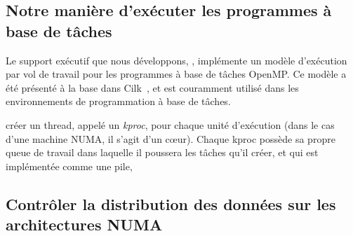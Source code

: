 \documentclass[parallelisme]{compas2016}
\begin{document}





\subsection{Notre manière d'exécuter les programmes à base de tâches}

Le support exécutif que nous développons, \kaapi, implémente un modèle d'exécution par vol
de travail pour les programmes à base de tâches OpenMP. Ce modèle a été présenté
à la base dans Cilk~\cite{cilk5}, et est couramment utilisé dans les environnements
de programmation à base de tâches.

\kaapi créer un thread, appelé un \emph{kproc}, pour chaque unité d'exécution
(dans le cas d'une machine NUMA, il s'agit d'un cœur).
Chaque kproc possède sa propre queue de travail dans laquelle il poussera les
tâches qu'il créer, et qui est implémentée comme une pile,

\vspace*{-1ex}
\subsection{Contrôler la distribution des données sur les architectures NUMA}
\end{document}
